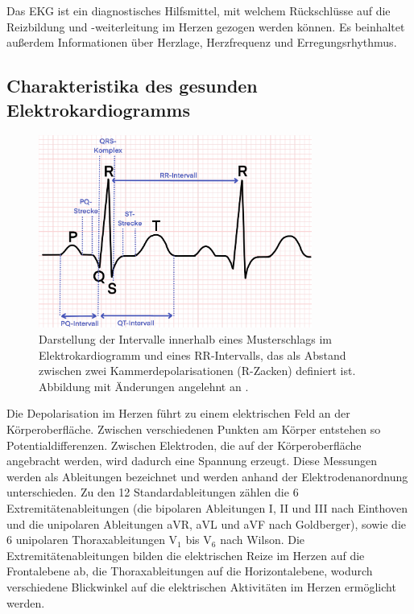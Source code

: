 Das \gls{EKG} ist ein diagnostisches Hilfsmittel, mit welchem Rückschlüsse auf die Reizbildung und -weiterleitung im Herzen gezogen werden können. Es beinhaltet außerdem Informationen über Herzlage, Herzfrequenz und Erregungsrhythmus. \cite{faller_korper_2004}

\subsection{Charakteristika des gesunden Elektrokardiogramms}


\begin{figure}[!ht]%
\centering
	\includegraphics[width=0.80\textwidth]{./Bilder/ekg.png}
\caption[Musterschlag im EKG]{Darstellung der Intervalle innerhalb eines Musterschlags im Elektrokardiogramm und eines RR-Intervalls, das als Abstand zwischen zwei Kammerdepolarisationen (R-Zacken) definiert ist. Abbildung mit Änderungen angelehnt an  \cite{rizwan_review_2021}.} 
\label{fig:EKG}
\end{figure}  

Die Depolarisation im Herzen führt zu einem elektrischen Feld an der Körperoberfläche. Zwischen verschiedenen Punkten am Körper entstehen so Potentialdifferenzen. Zwischen Elektroden, die auf der Körperoberfläche angebracht werden, wird dadurch eine Spannung erzeugt. Diese Messungen werden als Ableitungen bezeichnet und werden anhand der Elektrodenanordnung unterschieden. Zu den 12 Standardableitungen zählen die 6 Extremitätenableitungen (die bipolaren Ableitungen I, II und III nach Einthoven und die unipolaren Ableitungen aVR, aVL und aVF nach Goldberger), sowie die 6 unipolaren Thoraxableitungen V$_{1}$ bis V$_{6}$ nach Wilson. Die Extremitätenableitungen bilden die elektrischen Reize im Herzen auf die Frontalebene ab, die Thoraxableitungen auf die Horizontalebene, wodurch verschiedene Blickwinkel auf die elektrischen Aktivitäten im Herzen ermöglicht werden.~\cite{faller_korper_2004}

